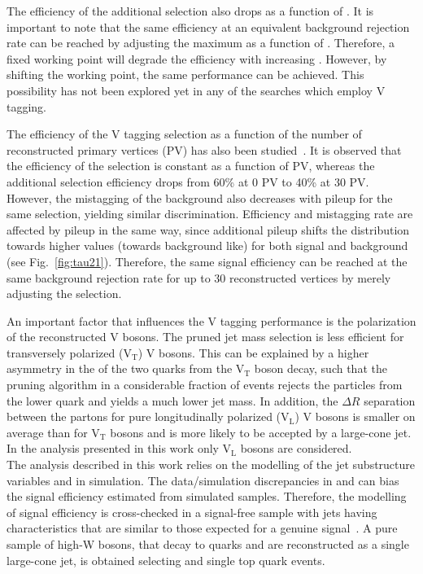 The efficiency of the additional \nsubj selection also drops as a function of \pt. It is important to note that the same efficiency at an equivalent background rejection rate can be reached by adjusting the maximum \nsubj as a function of \pt. Therefore, a fixed working point will degrade the efficiency with increasing \pt. However, by shifting the working point, the same performance can be achieved. This possibility has not been explored yet in any of the searches which employ V tagging.

The efficiency of the V tagging selection as a function of the number of reconstructed primary vertices (PV) has also been studied~\cite{JME-16-003}. It is observed that the efficiency of the \mJ selection is constant as a function of PV, whereas the additional \nsubj selection efficiency drops from 60\% at 0 PV to 40\% at 30 PV. However, the mistagging of the background also decreases with pileup for the same selection, yielding similar discrimination. Efficiency and mistagging rate are affected by pileup in the same way, since additional pileup shifts the \nsubj distribution towards higher values (towards background like) for both signal and background (see Fig.~\ref{fig:tau21}). Therefore, the same signal efficiency can be reached at the same background rejection rate for up to 30 reconstructed vertices by merely adjusting the \nsubj selection.

An important factor that influences the V tagging performance is the polarization of the reconstructed V bosons. The pruned jet mass selection is less efficient for transversely polarized (V$_\mathrm{T}$) V bosons. This can be explained by a higher asymmetry in the \pt of the two quarks from the V$_\mathrm{T}$ boson decay, such that the pruning algorithm in a considerable fraction of events rejects the particles from the lower \pt quark and yields a much lower jet mass. In addition, the $\Delta R$ separation between the partons for pure longitudinally polarized (V$_\mathrm{L}$) V bosons is smaller on average than for V$_\mathrm{T}$ bosons and is more likely to be accepted by a large-cone jet. In the analysis presented in this work only V$_\mathrm{L}$  bosons are considered.\\

The \lnujet analysis described in this work relies on the modelling of the jet substructure variables \mJ and \nsubj in simulation. The data/simulation discrepancies in \mJ and \nsubj can bias the signal efficiency estimated from simulated samples. Therefore, the modelling of signal efficiency is cross-checked in a signal-free sample with jets having characteristics that are similar to those expected for a genuine signal~\cite{JME-16-003}. A pure sample of high-\pt W bosons, that decay to quarks and are reconstructed as a single large-cone jet, is obtained selecting \ttbar and single top quark events.

